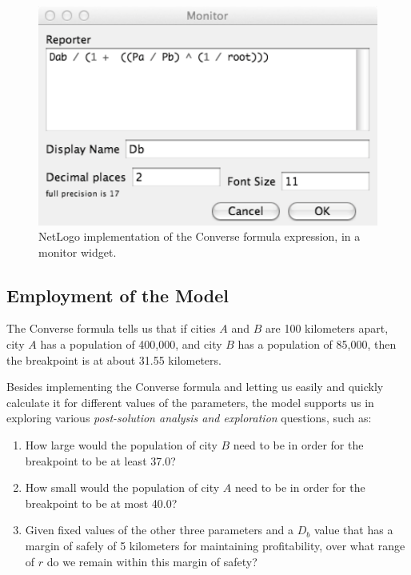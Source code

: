 \begin{figure}[htbp] %
   \centering
   \includegraphics[width=\textwidth]{figures/ConverseFormulaFormula.pdf} 
   \caption{NetLogo implementation of the Converse formula expression, in a monitor widget.}
   \label{fig:converseformulaexpressionnlogo}
\end{figure}

\subsection{Employment of the Model\label{sec:converse_employment}}


The Converse formula tells us that if cities $A$ and $B$ are 100 kilometers apart,  city $A$ has a population of 400,000, and city $B$ has a population of 85,000, then the breakpoint is at about 31.55 kilometers. 

Besides implementing the Converse formula and letting us easily and quickly calculate it for different values of the parameters, the model supports us in exploring various \emph{post-solution analysis and exploration} questions, such as:
\begin{enumerate}
\item How large would the population of city $B$ need to be in order for the breakpoint to be at least 37.0?
\item How small would the population of city $A$ need to be in order for the breakpoint to be at most 40.0?
\item Given fixed values of the other three parameters and a $D_b$ value that has a margin of safely of 5 kilometers for maintaining profitability, over what range of $r$ do we remain within this margin of safety?
\end{enumerate}


